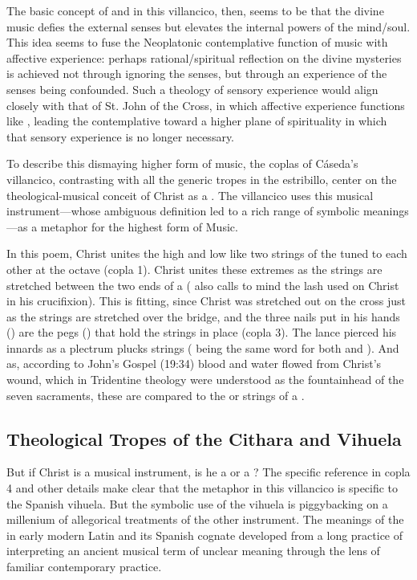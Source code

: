 The basic concept of  and  in this villancico, then, seems to be that the divine music defies the external senses but elevates the internal powers of the mind/soul.
This idea seems to fuse the Neoplatonic contemplative function of music with affective experience: perhaps rational/spiritual reflection on the divine mysteries is achieved not through ignoring the senses, but through an experience of the senses being confounded.
Such a theology of sensory experience would align closely with that of St. John of the Cross, in which affective experience functions like , leading the contemplative toward a higher plane of spirituality in which that sensory experience is no longer necessary.

To describe this dismaying higher form of music, the coplas of Cáseda's villancico, contrasting with all the generic tropes in the estribillo, center on the theological-musical conceit of Christ as a .
The villancico uses this musical instrument---whose ambiguous definition led to a rich range of symbolic meanings---as a metaphor for the highest form of Music.

In this poem, Christ unites the high and low like two strings of the  tuned to each other at the octave (copla 1). 
Christ unites these extremes as the strings are stretched between the two ends of a  ( also calls to mind the lash used on Christ in his crucifixion).
This is fitting, since Christ was stretched out on the cross just as the strings are stretched over the bridge, and the three nails put in his hands () are the pegs () that hold the strings in place (copla 3).
The lance pierced his innards as a plectrum plucks strings ( being the same word for both  and ).
And as, according to John's Gospel (19:34) blood and water flowed from Christ's wound, which in Tridentine theology were understood as the fountainhead of the seven sacraments, these are compared to the  or strings of a .

\subsection{Theological Tropes of the Cithara and Vihuela}

But if Christ is a musical instrument, is he a  or a ?
The specific reference in copla 4 and other details make clear that the metaphor in this villancico is specific to the Spanish  vihuela.
But the symbolic use of the vihuela is piggybacking on a millenium of allegorical treatments of the other instrument.
The meanings of the  in early modern Latin and its Spanish cognate  developed from a long practice of interpreting an ancient musical term of unclear meaning through the lens of familiar contemporary practice.

